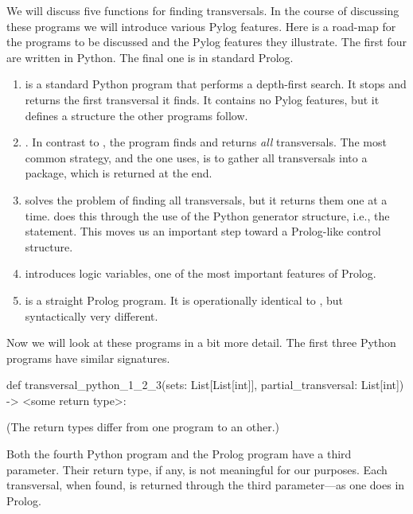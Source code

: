 \begin{sloppypar}
We will discuss five functions for finding transversals. In the course of discussing these programs we will introduce various Pylog features. Here is a road-map for the programs to be discussed and the Pylog features they illustrate. The first four are written in Python. The final one is in standard Prolog. 
\begin{enumerate}
\item {} is a standard Python program that performs a depth-first search. It stops and returns the first transversal it finds. It contains no Pylog features, but it defines a structure the other programs follow. 
\smallv
 
\item {}. In contrast to , the program  finds and returns \textit{all} transversals. The most common strategy, and the one  uses, is to gather all transversals into a package, which is returned at the end.
\smallv

\item {} solves the problem of finding all transversals, but it returns them one at a time.  does this through the use of the Python generator structure, i.e., the  statement. This moves us an important step toward a Prolog-like control structure.
\smallv
    
\item {} introduces logic variables, one of the most important features of Prolog.  

\item {} is a straight Prolog program. It is operationally identical to , but syntactically very different. 
\end{enumerate}

Now we will look at these programs in a bit more detail. The first three Python programs have similar signatures. 

\begin{python}
def transversal_python_1_2_3(sets: List[List[int]], 
                             partial_transversal: List[int])
                             -> <some return type>: 
\end{python}
(The return types differ from one program to an other.)

Both the fourth Python program and the Prolog program have a third parameter. Their return type, if any, is not meaningful for our purposes. Each transversal, when found, is returned through the third parameter---as one does in Prolog.


\end{sloppypar}
